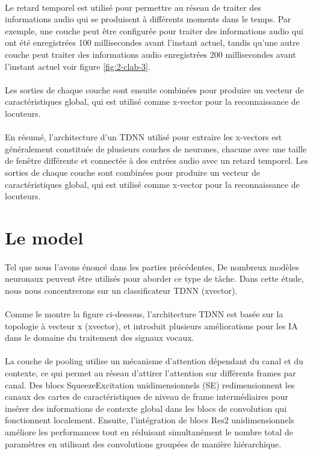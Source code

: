 \paragraph{}Le retard temporel est utilisé pour permettre au réseau de traiter des informations audio qui se produisent à différents moments dans le temps. Par exemple, une couche peut être configurée pour traiter des informations audio qui ont été enregistrées 100 millisecondes avant l'instant actuel, tandis qu'une autre couche peut traiter des informations audio enregistrées 200 millisecondes avant l'instant actuel voir figure \ref{fig:2-clab-3}.
\paragraph{}Les sorties de chaque couche sont ensuite combinées pour produire un vecteur de caractéristiques global, qui est utilisé comme x-vector pour la reconnaissance de locuteurs.
\paragraph{}En résumé, l'architecture d'un TDNN utilisé pour extraire les x-vectors est généralement constituée de plusieurs couches de neurones, chacune avec une taille de fenêtre différente et connectée à des entrées audio avec un retard temporel. Les sorties de chaque couche sont combinées pour produire un vecteur de caractéristiques global, qui est utilisé comme x-vector pour la reconnaissance de locuteurs.

\section{Le model}
\paragraph{}Tel que nous l’avons énoncé dans les parties précédentes, De nombreux modèles neuronaux peuvent être utilisés pour aborder ce type de tâche. Dans cette étude, nous nous concentrerons sur un classificateur TDNN (xvector).
\paragraph{}Comme le montre la figure ci-dessous, l’architecture TDNN est basée sur la topologie à vecteur x (xvector), et introduit plusieurs améliorations pour les IA dans le domaine du traitement des signaux vocaux.
\paragraph{}La couche de pooling utilise un mécanisme d'attention dépendant du canal et du contexte, ce qui permet au réseau d'attirer l'attention sur différents frames par canal. Des blocs SqueezeExcitation unidimensionnels (SE) redimensionnent les canaux des cartes de caractéristiques de niveau de frame intermédiaires pour insérer des informations de contexte global dans les blocs de convolution qui fonctionnent localement. Ensuite, l'intégration de blocs Res2 unidimensionnels améliore les performances tout en réduisant simultanément le nombre total de paramètres en utilisant des convolutions groupées de manière hiérarchique.
